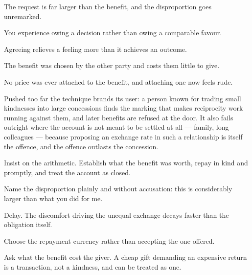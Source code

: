 \begin{feedback}
  \item The request is far larger than the benefit, and the disproportion goes unremarked.
  \item You experience owing a decision rather than owing a comparable favour.
  \item Agreeing relieves a feeling more than it achieves an outcome.
  \item The benefit was chosen by the other party and costs them little to give.
  \item No price was ever attached to the benefit, and attaching one now feels rude.
\end{feedback}

\begin{failure}
Pushed too far the technique brands its user: a person known for trading small kindnesses into large concessions finds the marking that makes reciprocity work running against them, and later benefits are refused at the door. It also fails outright where the account is not meant to be settled at all --- family, long colleagues --- because proposing an exchange rate in such a relationship is itself the offence, and the offence outlasts the concession.
\end{failure}

\begin{countermeasures}
  \item Insist on the arithmetic. Establish what the benefit was worth, repay in kind and promptly, and treat the account as closed.
  \item Name the disproportion plainly and without accusation: this is considerably larger than what you did for me.
  \item Delay. The discomfort driving the unequal exchange decays faster than the obligation itself.
  \item Choose the repayment currency rather than accepting the one offered.
  \item Ask what the benefit cost the giver. A cheap gift demanding an expensive return is a transaction, not a kindness, and can be treated as one.
\end{countermeasures}

\seesources
{}
